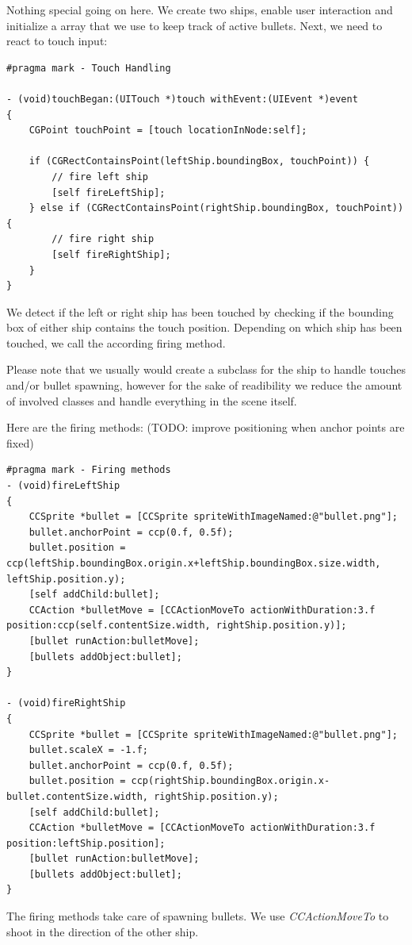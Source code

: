 Nothing special going on here. We create two ships, enable user interaction and
initialize a array that we use to keep track of active bullets.
Next, we need to react to touch input:
\begin{lstlisting}[title=examples/ParticleGamePlayScene.m]
#pragma mark - Touch Handling

- (void)touchBegan:(UITouch *)touch withEvent:(UIEvent *)event
{
    CGPoint touchPoint = [touch locationInNode:self];
    
    if (CGRectContainsPoint(leftShip.boundingBox, touchPoint)) {
        // fire left ship
        [self fireLeftShip];
    } else if (CGRectContainsPoint(rightShip.boundingBox, touchPoint)) {
        // fire right ship
        [self fireRightShip];
    }
}
\end{lstlisting}
We detect if the left or right ship has been touched by checking if the bounding
box of either ship contains the touch position. Depending on which ship has been
touched, we call the according firing method. 
\begin{lamp}[frametitle={Code Structure}] 
Please note that we usually would create a subclass for the ship to handle
touches and/or bullet spawning, however for the sake of readibility we reduce the amount of involved classes and handle everything in the scene itself.
\end{lamp}
Here are the firing methods: (TODO: improve positioning when anchor points are
fixed) 
\begin{lstlisting}[title=examples/ParticleGamePlayScene.m]
#pragma mark - Firing methods
- (void)fireLeftShip
{
    CCSprite *bullet = [CCSprite spriteWithImageNamed:@"bullet.png"];
    bullet.anchorPoint = ccp(0.f, 0.5f);
    bullet.position = ccp(leftShip.boundingBox.origin.x+leftShip.boundingBox.size.width, leftShip.position.y);
    [self addChild:bullet];
    CCAction *bulletMove = [CCActionMoveTo actionWithDuration:3.f position:ccp(self.contentSize.width, rightShip.position.y)];
    [bullet runAction:bulletMove];
    [bullets addObject:bullet];
}

- (void)fireRightShip
{
    CCSprite *bullet = [CCSprite spriteWithImageNamed:@"bullet.png"];
    bullet.scaleX = -1.f;
    bullet.anchorPoint = ccp(0.f, 0.5f);
    bullet.position = ccp(rightShip.boundingBox.origin.x-bullet.contentSize.width, rightShip.position.y);
    [self addChild:bullet];
    CCAction *bulletMove = [CCActionMoveTo actionWithDuration:3.f position:leftShip.position];
    [bullet runAction:bulletMove];
    [bullets addObject:bullet];
}
\end{lstlisting}
The firing methods take care of spawning bullets. We use \textit{CCActionMoveTo}
to shoot in the direction of the other ship. 

